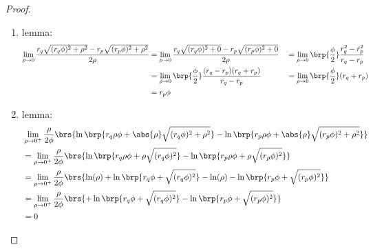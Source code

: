 \begin{proof}
\begin{enumerate}
  \item lemma: \label{item:larcR_rho_lem1}
    \begin{align*}
        \lim_{\rho\to0}
             \frac{r_q\sqrt{(r_q\phi)^2+\rho^2}-r_p\sqrt{(r_p\phi)^2+\rho^2}}
                  {2\rho} 
          &= \lim_{\rho\to0}
             \frac{r_q\sqrt{(r_q\phi)^2+0}-r_p\sqrt{(r_p\phi)^2+0}}
                  {2\rho} 
         &&= \lim_{\rho\to0}\brp{\frac{\phi}{2}}
             \frac{r_q^2-r_p^2}{r_q-r_p} 
        \\&= \lim_{\rho\to0}\brp{\frac{\phi}{2}}
             \frac{(r_q-r_p)(r_q+r_p)}{r_q-r_p} 
         &&= \lim_{\rho\to0}\brp{\frac{\phi}{2}}(r_q+r_p)
        \\&= r_p\phi
    \end{align*}

  \item lemma: \label{item:larcR_rho_lem2}
    \begin{align*}
        &\lim_{\rho\to0^+}\frac{\rho}{2\phi}\brs{ 
               \ln\brp{r_q\rho\phi+\abs{\rho}\sqrt{(r_q\phi)^2+\rho^2}}
             - \ln\brp{r_p\rho\phi+\abs{\rho}\sqrt{(r_p\phi)^2+\rho^2}}
             }
        \\&= \lim_{\rho\to0^+}
             \frac{\rho}{2\phi}\brs{ 
               \ln\brp{r_q\rho\phi+\rho\sqrt{(r_q\phi)^2}}
             - \ln\brp{r_p\rho\phi+\rho\sqrt{(r_p\phi)^2}}
             }
        \\&= \lim_{\rho\to0^+}
             \frac{\rho}{2\phi}\brs{ 
               \ln(\rho)+\ln\brp{r_q\phi+\sqrt{(r_q\phi)^2}}
             - \ln(\rho) - \ln\brp{r_p\phi+\sqrt{(r_p\phi)^2}}
             }
        \\&= \lim_{\rho\to0^+}
              \frac{\rho}{2\phi}\brs{ 
             +\ln\brp{r_q\phi+\sqrt{(r_q\phi)^2}}
             -\ln\brp{r_p\phi+\sqrt{(r_p\phi)^2}}
             }
        \\&= 0
    \end{align*}


\end{enumerate}
\end{proof}
